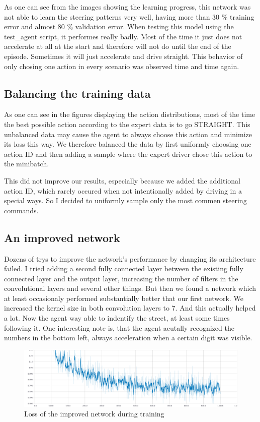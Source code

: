 \documentclass[
        a4paper,
        10pt,
        parskip = full,    %
    ]{scrartcl}
\begin{document}
As one can see from the images showing the learning progress, this network was
not able to learn the steering patterns very well, having more than 30 \%
training error and almost 80 \% validation error. When testing this model
using the test_agent script, it performes really badly. Most of the time it
just does not accelerate at all at the start and therefore will not do until the
end of the episode. Sometimes it will just accelerate and drive straight.
This behavior of only chosing one action in every scenario was observed time and
time again.

\subsection{Balancing the training data}
As one can see in the figures displaying the action distributions, most of the
time the best possible action according to the expert data is to go STRAIGHT.
This unbalanced data may cause the agent to always choose this action and minimize
its loss this way. We therefore balanced the data by first uniformly choosing one
action ID and then adding a sample where the expert driver chose this action to
the minibatch.

This did not improve our results, especially because we added the additional
action ID, which rarely occured when not intentionally added by driving in a
special ways. So I decided to uniformly sample only the most commen steering commands.

\subsection{An improved network}
Dozens of trys to improve the network's performance by changing its architecture failed. I tried adding a second fully connected layer between the existing fully connected layer and the output layer, increasing the number of filters in the convolutional layers and several other things. But then we found a network which at least occasionaly performed substantially better that our first network.
We increased the kernel size in both convolution layers to 7.
And this actually helped a lot. Now the agent way able to indentify the street,
at least some times following it.
One interesting note is, that the agent acutally recognized the numbers in the
bottom left, always acceleration when a certain digit was visible.

\begin{figure}[H]
  \begin{center}
    \includegraphics[width=16cm]{../images/improved_loss.pdf}
    \caption{Loss of the improved network during training}
    \label{Learning measurements}
  \end{center}
\end{figure}
\end{document}
